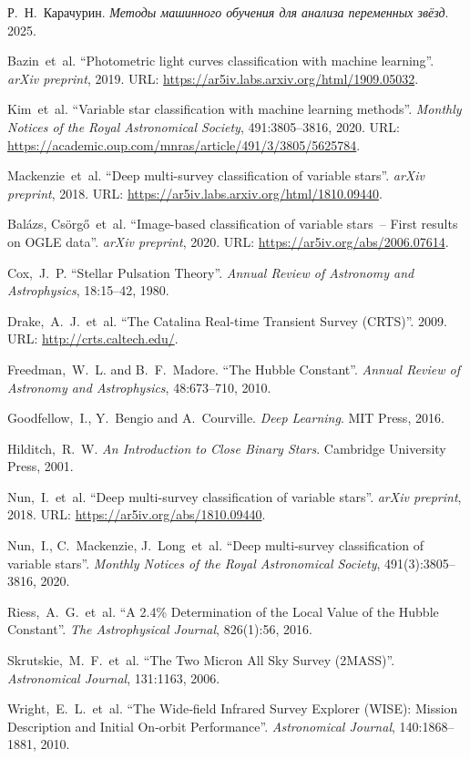 \documentclass[12pt,a4paper]{article}
\begin{document}
\newpage

\begin{thebibliography}{99}
 Р.~Н.~Карачурин. \textit{Методы машинного обучения для анализа переменных звёзд}. 2025.

 Bazin~et~al. ``Photometric light curves classification with machine learning''. \textit{arXiv preprint}, 2019. URL: \url{https://ar5iv.labs.arxiv.org/html/1909.05032}.

 Kim~et~al. ``Variable star classification with machine learning methods''. \textit{Monthly Notices of the Royal Astronomical Society}, 491:3805–3816, 2020. URL: \url{https://academic.oup.com/mnras/article/491/3/3805/5625784}.

 Mackenzie~et~al. ``Deep multi-survey classification of variable stars''. \textit{arXiv preprint}, 2018. URL: \url{https://ar5iv.labs.arxiv.org/html/1810.09440}.

 Balázs, Csörgő~et~al. ``Image-based classification of variable stars – First results on OGLE data''. \textit{arXiv preprint}, 2020. URL: \url{https://ar5iv.org/abs/2006.07614}.

 Cox, J.~P. ``Stellar Pulsation Theory''. \textit{Annual Review of Astronomy and Astrophysics}, 18:15–42, 1980.

 Drake, A.~J.~et~al. ``The Catalina Real-time Transient Survey (CRTS)''. 2009. URL: \url{http://crts.caltech.edu/}.

 Freedman, W.~L. and B.~F.~Madore. ``The Hubble Constant''. \textit{Annual Review of Astronomy and Astrophysics}, 48:673–710, 2010.

 Goodfellow, I., Y.~Bengio and A.~Courville. \textit{Deep Learning}. MIT Press, 2016.

 Hilditch, R.~W. \textit{An Introduction to Close Binary Stars}. Cambridge University Press, 2001.

 Nun, I.~et~al. ``Deep multi-survey classification of variable stars''. \textit{arXiv preprint}, 2018. URL: \url{https://ar5iv.org/abs/1810.09440}.

 Nun, I., C.~Mackenzie, J.~Long~et~al. ``Deep multi-survey classification of variable stars''. \textit{Monthly Notices of the Royal Astronomical Society}, 491(3):3805–3816, 2020.

 Riess, A.~G.~et~al. ``A 2.4\% Determination of the Local Value of the Hubble Constant''. \textit{The Astrophysical Journal}, 826(1):56, 2016.

 Skrutskie, M.~F.~et~al. ``The Two Micron All Sky Survey (2MASS)''. \textit{Astronomical Journal}, 131:1163, 2006.

 Wright, E.~L.~et~al. ``The Wide‑field Infrared Survey Explorer (WISE): Mission Description and Initial On‑orbit Performance''. \textit{Astronomical Journal}, 140:1868–1881, 2010.
\end{thebibliography}
\end{document}
